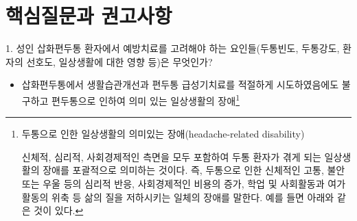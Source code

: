\documentclass[]{book}
\let\rmarkdownfootnote\footnote%
\def\footnote{\protect\rmarkdownfootnote}
\begin{document}
\hypertarget{section-3}{%
\section{핵심질문과 권고사항}\label{section-3}}

1. 성인 삽화편두통 환자에서 예방치료를 고려해야 하는 요인들(두통빈도, 두통강도, 환자의 선호도, 일상생활에 대한 영향 등)은 무엇인가?

\begin{itemize}
\item
  삽화편두통에서 생활습관개선과 편두통 급성기치료를 적절하게 시도하였음에도 불구하고 편두통으로 인하여 의미 있는 일상생활의 장애\footnote{두통으로 인한 일상생활의 의미있는 장애(headache-related disability)

    신체적, 심리적, 사회경제적인 측면을 모두 포함하여 두통 환자가 겪게 되는 일상생활의 장애를 포괄적으로 의미하는 것이다. 즉, 두통으로 인한 신체적인 고통, 불안 또는 우울 등의 심리적 반응, 사회경제적인 비용의 증가, 학업 및 사회활동과 여가활동의 위축 등 삶의 질을 저하시키는 일체의 장애를 말한다. 예를 들면 아래와 같은 것이 있다.

}
\end{itemize}
\end{document}
